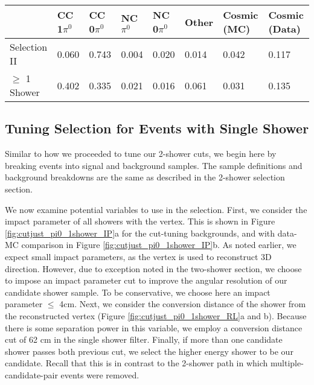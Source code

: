 \documentclass{article}
\begin{document}
\begin{table}[H]
\centering
{}
 \begin{tabular}{| l | l | l |l|l|l|l|l|}
 \hline
 & CC 1$\pi^0$ & CC 0$\pi^0$ & NC $\pi^0$ & NC 0$\pi^0$ & Other & Cosmic (MC) & Cosmic (Data) \\ [0.1ex] \hline
Selection II & 0.060 & 0.743 & 0.004 & 0.020 & 0.014 & 0.042 & 0.117 \\
$\geq$ 1 Shower & 0.402 & 0.335 & 0.021 & 0.016 & 0.061 & 0.031 & 0.135\\ \hline
\end{tabular}
\end{table}

\subsection{Tuning Selection for Events with Single Shower}

Similar to how we proceeded to tune our 2-shower cuts, we begin here by breaking events into signal and background samples.  The sample definitions and background breakdowns are the same as described in the 2-shower selection section.

\par We now examine potential variables to use in the selection.  First, we consider the impact parameter of all showers with the vertex.  This is shown in Figure \ref{fig:cutjust_pi0_1shower_IP}a for the cut-tuning backgrounds, and with data-MC comparison in Figure \ref{fig:cutjust_pi0_1shower_IP}b. As noted earlier, we expect small impact parameters, as the vertex is used to reconstruct 3D direction. However, due to exception noted in the two-shower section, we choose to impose an impact parameter cut to improve the angular resolution of our candidate shower sample. To be conservative, we choose here an impact parameter $\leq$ 4cm. Next, we consider the conversion distance of the shower from the reconstructed vertex (Figure \ref{fig:cutjust_pi0_1shower_RL}a and b). Because there is some separation power in this variable, we employ a conversion distance cut of 62 cm in the single shower filter. Finally, if more than one candidate shower passes both previous cut, we select the higher energy shower to be our candidate.  Recall that this is in contrast to the 2-shower path in which multiple-candidate-pair events were removed.
\end{document}
